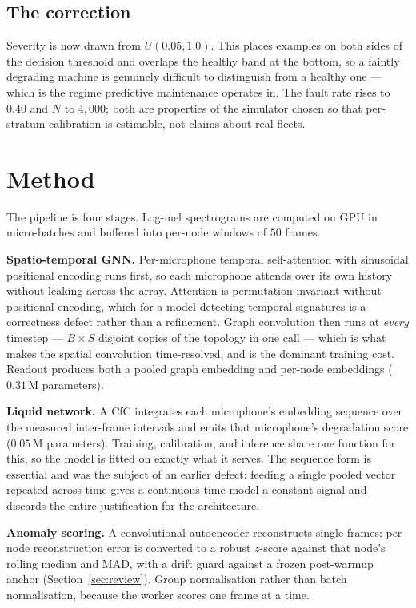 \documentclass[11pt]{article}
\let\oldsection\section
\renewcommand{\section}{\clearpage\oldsection}
\begin{document}
\subsection{The correction}

Severity is now drawn from $U(0.05, 1.0)$. This places examples on both sides of
the decision threshold and overlaps the healthy band at the bottom, so a faintly
degrading machine is genuinely difficult to distinguish from a healthy one ---
which is the regime predictive maintenance operates in. The fault rate rises to
$0.40$ and $N$ to $4{,}000$; both are properties of the simulator chosen so that
per-stratum calibration is estimable, not claims about real fleets.

\section{Method}

The pipeline is four stages. Log-mel spectrograms are computed on GPU in
micro-batches and buffered into per-node windows of $50$ frames.

\textbf{Spatio-temporal GNN.} Per-microphone temporal self-attention with
sinusoidal positional encoding runs first, so each microphone attends over its
own history without leaking across the array. Attention is permutation-invariant
without positional encoding, which for a model detecting temporal signatures is
a correctness defect rather than a refinement. Graph convolution then runs at
\emph{every} timestep --- $B \times S$ disjoint copies of the topology in one
call --- which is what makes the spatial convolution time-resolved, and is the
dominant training cost. Readout produces both a pooled graph embedding and
per-node embeddings ($0.31$\,M parameters).

\textbf{Liquid network.} A CfC integrates each microphone's embedding sequence
over the measured inter-frame intervals and emits that microphone's degradation
score ($0.05$\,M parameters). Training, calibration, and inference share one
function for this, so the model is fitted on exactly what it serves. The sequence form is
essential and was the subject of an earlier defect: feeding a single pooled
vector repeated across time gives a continuous-time model a constant signal and
discards the entire justification for the architecture.

\textbf{Anomaly scoring.} A convolutional autoencoder reconstructs single frames;
per-node reconstruction error is converted to a robust $z$-score against that
node's rolling median and MAD, with a drift guard against a frozen post-warmup
anchor (Section~\ref{sec:review}). Group normalisation rather than batch
normalisation, because the worker scores one frame at a time.
\end{document}
